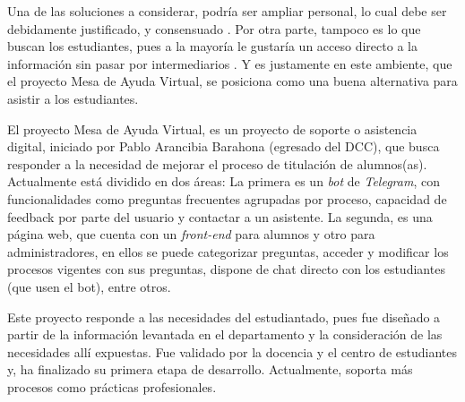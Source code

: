     \par Una de las soluciones a considerar, podría ser ampliar personal, lo cual debe ser debidamente justificado, y consensuado \cite{Chile2014}. Por otra parte, tampoco es lo que buscan los estudiantes, pues a la mayoría le gustaría un acceso directo a la información sin pasar por intermediarios \cite{ARANCIBIA2021}. Y es justamente en este ambiente, que el proyecto Mesa de Ayuda Virtual, se posiciona como una buena alternativa para asistir a los estudiantes.
    
    \par El proyecto Mesa de Ayuda Virtual, es un proyecto de soporte o asistencia digital, iniciado por Pablo Arancibia Barahona (egresado del DCC), que busca responder a la necesidad de mejorar el proceso de titulación de alumnos(as). Actualmente está dividido en dos áreas: La primera es un \textit{bot} de \textit{Telegram}, con funcionalidades como preguntas frecuentes agrupadas por proceso, capacidad de feedback por parte del usuario y contactar a un asistente. La segunda, es una página web, que cuenta con un \textit{front-end} para alumnos y otro para administradores, en ellos se puede categorizar preguntas, acceder y modificar los procesos vigentes con sus preguntas, dispone de chat directo con los estudiantes (que usen el bot), entre otros.
    
    \par Este proyecto responde a las necesidades del estudiantado, pues fue diseñado a partir de la información levantada en el departamento y la consideración de las necesidades allí expuestas. Fue validado por la docencia y el centro de estudiantes y, ha finalizado su primera etapa de desarrollo. Actualmente, soporta más procesos como prácticas profesionales.

